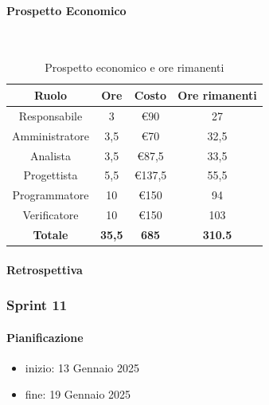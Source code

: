 \documentclass{article}
\begin{document}
                \paragraph{Prospetto Economico}\mbox{}\\
                \begin{table}[H]
                    \centering
                    \begin{tabular}{|c|c|c|c|}
                    \hline
                    \textbf{Ruolo}  & \textbf{Ore}  & \textbf{Costo} & \textbf{Ore rimanenti} \\ \hline
                    Responsabile    & 3             & €90            & 27                     \\ \hline
                    Amministratore  & 3,5           & €70            & 32,5                   \\ \hline
                    Analista        & 3,5           & €87,5          & 33,5                   \\ \hline
                    Progettista     & 5,5           & €137,5         & 55,5                   \\ \hline
                    Programmatore   & 10            & €150           & 94                    \\ \hline
                    Verificatore    & 10            & €150           & 103                    \\ \hline
                    \textbf{Totale} & \textbf{35,5} & \textbf{685}   & \textbf{310.5}         \\ \hline
                    \end{tabular}
                    \caption{Prospetto economico e ore rimanenti}
                \end{table}

                \paragraph{Retrospettiva}
            \subsubsection{Sprint 11}
                \paragraph{Pianificazione}
                \begin{itemize}
                    \item inizio: 13 Gennaio 2025
                    \item fine: 19 Gennaio 2025
                \end{itemize}
\end{document}
